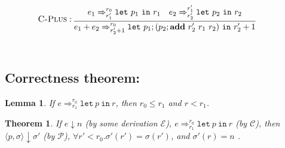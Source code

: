 \documentclass[a4paper]{article}
\newtheorem{thm}[equation]{Theorem}
\newtheorem{lem}[equation]{Lemma}
\def\Add#1#2#3{\mathbf{add} \ #1 \ #2 \ #3 }
\def\Eva{\downarrow}
\def\Ra{\Rightarrow}
\def\Sgm{\sigma}
\def\MC{\mathcal{C}}
\def\ME{\mathcal{E}}
\def\MP{\mathcal{P}}
\def\TaSem#1#2#3{\langle #1,#2 \rangle \Eva #3}
\def\Talet#1#2{\mathtt{let} \ #1 \ \mathtt{in} \ #2}
\def\CRule#1#2{\textsc{C-#1} : \vcenter{#2}}
\begin{document}
$$
\CRule{Plus}{\infer{e_1+e_2 \Ra^{r_0}_{r_2'+1} \Talet{p_1;(p_2;\Add{r_2'}{r_1}{r_2})}{r_2'+1}}
{e_1 \Ra^{r_0}_{r_1'} \Talet{p_1}{r_1}  & e_2 \Ra^{r_1'}_{r_2'} \Talet{p_2}{r_2}}
}\qquad 
$$ \\[1ex]


\subsection{Correctness theorem:}

\begin{lem}
	If $e \Ra^{r_0}_{r_1} \Talet{p}{r}$, then $r_0 \le r_1$ and $r < r_1$.
	\label{fresh}
\end{lem}

\begin{thm}
 If $e \Eva n$ (by some derivation $\ME$), $e \Ra^{r_0}_{r_1} \Talet{p}{r}$ (by $\MC$), then $\TaSem{p}{\Sgm}{\Sgm'}$ (by $\MP$), $\forall r' < r_0.\Sgm'(r') = \Sgm(r')$, and $\Sgm'(r) = n$ .  
\end{thm}
 
\end{document}

